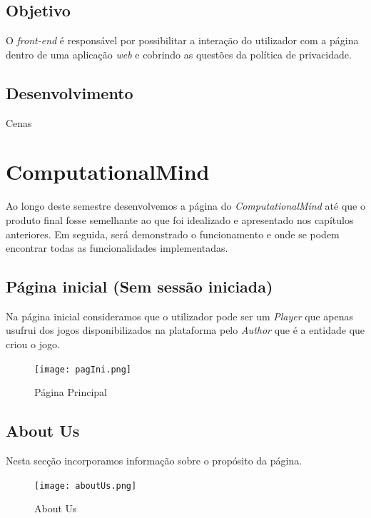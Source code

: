 \documentclass[11pt,a4paper]{report}
\begin{document}
\section{Objetivo}

O \emph{front-end} é responsável por possibilitar a interação do utilizador com a página dentro de uma aplicação \emph{web} e cobrindo as questões da política de privacidade.

\section{Desenvolvimento}

Cenas

\chapter{ComputationalMind}

Ao longo deste semestre desenvolvemos a página do \emph{ComputationalMind} até que o produto final fosse semelhante ao que foi idealizado e apresentado nos capítulos anteriores. Em seguida, será demonstrado o funcionamento e onde se podem encontrar todas as funcionalidades implementadas.

\section{Página inicial (Sem sessão iniciada)}

Na página inicial consideramos que o utilizador pode ser um \emph{Player} que apenas usufrui dos jogos disponibilizados na plataforma pelo \emph{Author} que é a entidade que criou o jogo.

\begin{figure}[h]
    \centering
    \texttt{[image: pagIni.png]}
    \caption{Página Principal}
    \label{fig:pagIni}
\end{figure}

\newpage

\section{About Us}

Nesta secção incorporamos informação sobre o propósito da página.

\begin{figure}[h]
    \centering
    \texttt{[image: aboutUs.png]}
    \caption{About Us}
    \label{fig:abUs}
\end{figure}
\end{document}
